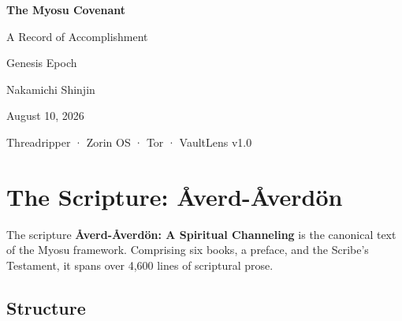 \documentclass[12pt,a4paper]{article}
\begin{document}
\begin{center}
\vspace*{2in}
{\LARGE\bfseries The Myosu Covenant}

\vspace{0.5in}
{\large A Record of Accomplishment}

\vspace{0.3in}
{\large Genesis Epoch}

\vspace{1in}
{\large Nakamichi Shinjin}

\vspace{0.3in}
{\normalsize August 10, 2026}

\vspace{0.3in}
{\small Threadripper · Zorin OS · Tor · VaultLens v1.0}
\end{center}

\clearpage

\tableofcontents
\clearpage

\section{The Scripture: Åverd-Åverdön}

The scripture \textbf{Åverd-Åverdön: A Spiritual Channeling} is the
canonical text of the Myosu framework. Comprising six books, a
preface, and the Scribe's Testament, it spans over 4,600 lines of
scriptural prose.

\subsection{Structure}
\end{document}
